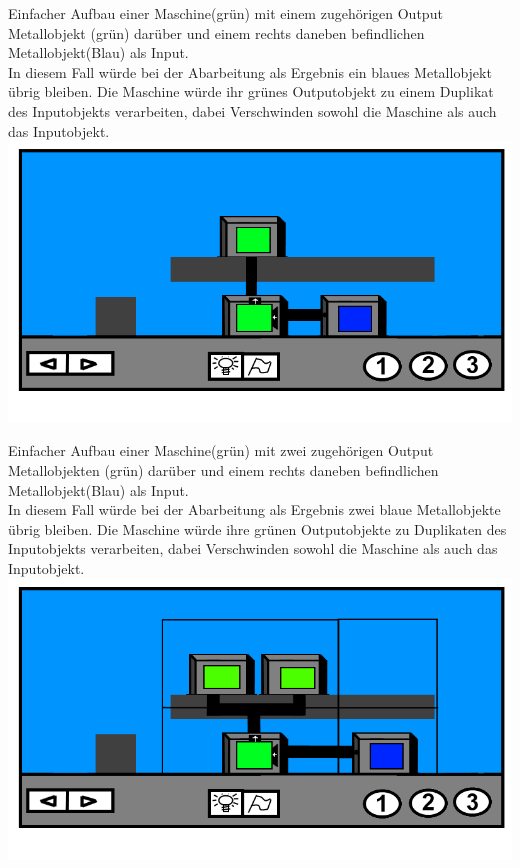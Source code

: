 \documentclass{scrartcl}
\begin{document}
\begin{description}
		\begin{minipage}{1\textwidth}
			Einfacher Aufbau einer Maschine(grün) mit einem zugehörigen Output Metallobjekt (grün) darüber und einem rechts daneben befindlichen Metallobjekt(Blau) als Input.\\
			In diesem Fall würde bei der Abarbeitung als Ergebnis ein blaues Metallobjekt übrig bleiben. Die Maschine würde ihr grünes Outputobjekt zu einem Duplikat des Inputobjekts verarbeiten, dabei Verschwinden sowohl die Maschine als auch das Inputobjekt.\\
			\includegraphics[scale=0.5]{assets/LevelBsp1Out}\\
		\end{minipage}
		
		\begin{minipage}{1\textwidth}
			Einfacher Aufbau einer Maschine(grün) mit zwei zugehörigen Output Metallobjekten (grün) darüber und einem rechts daneben befindlichen Metallobjekt(Blau) als Input.\\
			In diesem Fall würde bei der Abarbeitung als Ergebnis zwei blaue Metallobjekte übrig bleiben. Die Maschine würde ihre grünen Outputobjekte zu Duplikaten des Inputobjekts verarbeiten, dabei Verschwinden sowohl die Maschine als auch das Inputobjekt.\\
			\includegraphics[scale=0.5]{assets/LevelBsp2Out}\\
		\end{minipage}
		

\end{description}
\end{document}
